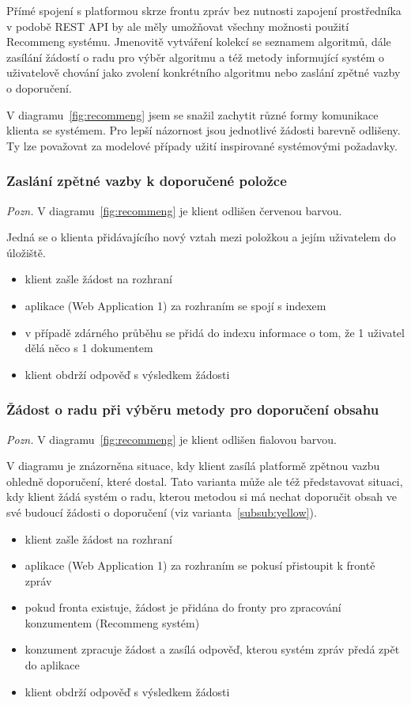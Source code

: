 \documentclass[thesis=M,czech]{FITthesis}[2014/05/07]
\begin{document}
Přímé spojení s platformou skrze frontu zpráv bez nutnosti zapojení prostředníka v podobě REST API by ale měly umožňovat všechny možnosti použití Recommeng systému. Jmenovitě vytváření kolekcí se seznamem algoritmů, dále zasílání žádostí o radu pro výběr algoritmu a též metody informující systém o uživatelově chování jako zvolení konkrétního algoritmu nebo zaslání zpětné vazby o doporučení. 

V diagramu~\ref{fig:recommeng} jsem se snažil zachytit různé formy komunikace klienta se systémem. Pro lepší názornost jsou jednotlivé žádosti barevně odlišeny. Ty lze považovat za modelové případy užití inspirované systémovými požadavky.

\subsubsection{Zaslání zpětné vazby k doporučené položce}

\emph{Pozn.} V diagramu~\ref{fig:recommeng} je klient odlišen červenou barvou. 

Jedná se o klienta přidávajícího nový vztah mezi položkou a jejím uživatelem do úložiště.

\begin{itemize}
	\item klient zašle žádost na rozhraní
	\item aplikace (Web Application 1) za rozhraním se spojí s indexem
	\item v případě zdárného průběhu se přidá do indexu informace o tom, že 1 uživatel dělá něco s 1 dokumentem
	\item klient obdrží odpověď s výsledkem žádosti
\end{itemize}

\subsubsection{Žádost o radu při výběru metody pro doporučení obsahu}
\label{subsub:purple}

\emph{Pozn.} V diagramu~\ref{fig:recommeng} je klient odlišen fialovou barvou.

V diagramu je znázorněna situace, kdy klient zasílá platformě zpětnou vazbu ohledně doporučení, které dostal. Tato varianta může ale též představovat situaci, kdy klient žádá systém o radu, kterou metodou si má nechat doporučit obsah ve své budoucí žádosti o doporučení (viz varianta~\ref{subsub:yellow}).

\begin{itemize}
	\item klient zašle žádost na rozhraní
	\item aplikace (Web Application 1) za rozhraním se pokusí přistoupit k frontě zpráv
	\item pokud fronta existuje, žádost je přidána do fronty pro zpracování konzumentem (Recommeng systém)
	\item konzument zpracuje žádost a zasílá odpověď, kterou systém zpráv předá zpět do aplikace
	\item klient obdrží odpověď s výsledkem žádosti
\end{itemize}
\end{document}
